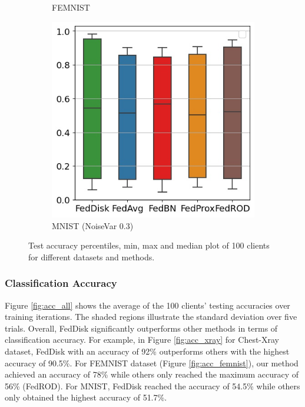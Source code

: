 \documentclass[mathfont=newtx]{uai2023} %
\newcommand{\MethodnameShort}{FedDisk}
\newcommand\parties{100}
\begin{document}
\begin{figure}[ht!]
\begin{subfigure}[t]{0.3\linewidth}
		\caption{FEMNIST}
		\label{fig:cl_acc_femnist}
	\end{subfigure}
	\hspace{0.01em}%
	\begin{subfigure}[t]{0.3\linewidth}	
		\includegraphics[width=\linewidth]{Figures/mnist/ClientAcc}
		\caption{MNIST (NoiseVar 0.3) }
		\label{fig:cl_acc_mnist}
	\end{subfigure}
	\caption{Test accuracy percentiles, min, max and median plot of \parties{} clients for different datasets and methods. }
	\label{fig:cl_acc_all}
\end{figure}

\subsubsection{Classification Accuracy} Figure \ref{fig:acc_all} shows the average of the \parties{} clients' testing accuracies over training iterations. The shaded regions illustrate the standard deviation over five trials. Overall, \MethodnameShort{} significantly outperforms other methods in terms of classification accuracy. For example, in Figure \ref{fig:acc_xray} for Chest-Xray dataset, \MethodnameShort{} with an accuracy of 92\% outperforms others with the highest accuracy of 90.5\%. For FEMNIST dataset (Figure \ref{fig:acc_femnist}), our method achieved an accuracy of 78\% while others only reached the maximum accuracy of 56\% (FedROD). For MNIST, \MethodnameShort{} reached the accuracy of 54.5\% while others only obtained the highest accuracy of 51.7\%. 
\end{document}
